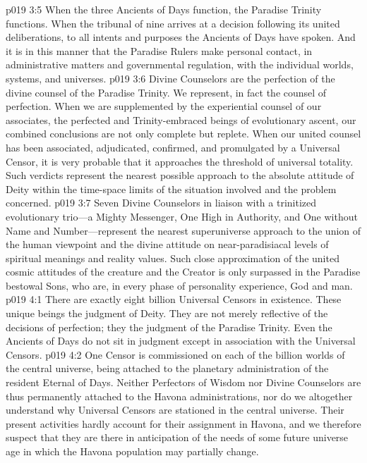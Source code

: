 \vs p019 3:5 When the three Ancients of Days function, the Paradise Trinity functions. When the tribunal of nine arrives at a decision following its united deliberations, to all intents and purposes the Ancients of Days have spoken. And it is in this manner that the Paradise Rulers make personal contact, in administrative matters and governmental regulation, with the individual worlds, systems, and universes.
\pc \vs p019 3:6 Divine Counselors are the perfection of the divine counsel of the Paradise Trinity. We represent, in fact  the counsel of perfection. When we are supplemented by the experiential counsel of our associates, the perfected and Trinity\hyp{}embraced beings of evolutionary ascent, our combined conclusions are not only complete but replete. When our united counsel has been associated, adjudicated, confirmed, and promulgated by a Universal Censor, it is very probable that it approaches the threshold of universal totality. Such verdicts represent the nearest possible approach to the absolute attitude of Deity within the time\hyp{}space limits of the situation involved and the problem concerned.
\vs p019 3:7 Seven Divine Counselors in liaison with a trinitized evolutionary trio---a Mighty Messenger, One High in Authority, and One without Name and Number---represent the nearest superuniverse approach to the union of the human viewpoint and the divine attitude on near\hyp{}paradisiacal levels of spiritual meanings and reality values. Such close approximation of the united cosmic attitudes of the creature and the Creator is only surpassed in the Paradise bestowal Sons, who are, in every phase of personality experience, God and man.
\vs p019 4:1 There are exactly eight billion Universal Censors in existence. These unique beings  the judgment of Deity. They are not merely reflective of the decisions of perfection; they  the judgment of the Paradise Trinity. Even the Ancients of Days do not sit in judgment except in association with the Universal Censors.
\vs p019 4:2 One Censor is commissioned on each of the billion worlds of the central universe, being attached to the planetary administration of the resident Eternal of Days. Neither Perfectors of Wisdom nor Divine Counselors are thus permanently attached to the Havona administrations, nor do we altogether understand why Universal Censors are stationed in the central universe. Their present activities hardly account for their assignment in Havona, and we therefore suspect that they are there in anticipation of the needs of some future universe age in which the Havona population may partially change.

